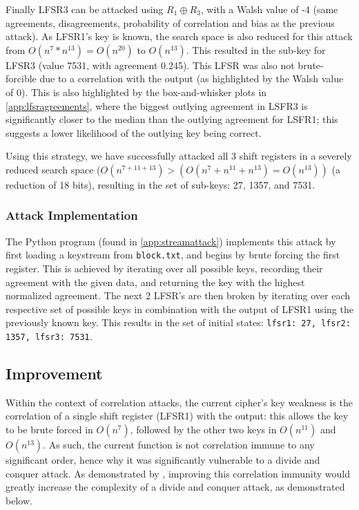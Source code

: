 \documentclass[british,10pt,a4paper]{article}
\begin{document}
Finally LFSR3 can be attacked using \(R_1 \oplus R_3\), with a Walsh value of -4 (same agreements, disagreements, probability of correlation and bias as the previous attack).
As LFSR1's key is known, the search space is also reduced for this attack from \(O(n^{7} * n^{13})=O(n^{20})\) to \(O(n^{13})\). This resulted in the sub-key for LFSR3 (value 7531, with agreement 0.245). This LFSR was also not brute-forcible due to a correlation with the output (as highlighted by the Walsh value of 0). This is also highlighted by the box-and-whisker plots in \autoref{app:lfsragreements}, where the biggest outlying agreement in LSFR3 is significantly closer to the median than the outlying agreement for LSFR1; this suggests a lower likelihood of the outlying key being correct.

Using this strategy, we have successfully attacked all 3 shift registers in a severely reduced search space (\(O(n^{7+11+13})>(O(n^{7}+n^{11}+n^{13})=O(n^{13}))\) (a reduction of 18 bits), resulting in the set of sub-keys: 27, 1357, and 7531.
\subsubsection{Attack Implementation}
The Python program (found in \autoref{app:streamattack}) implements this attack by first loading a keystream from \lstinline{block.txt}, and begins by brute forcing the first register.
This is achieved by iterating over all possible keys, recording their agreement with the given data, and returning the key with the highest normalized agreement.
The next 2 LFSR's are then broken by iterating over each respective set of possible keys in combination with the output of LFSR1 using the previously known key.
This results in the set of initial states: \lstinline{lfsr1: 27, lfsr2: 1357, lfsr3: 7531}.

\subsection{Improvement}
Within the context of correlation attacks, the current cipher's key weakness is the correlation of a single shift register (LFSR1) with the output: this allows the key to be brute forced in \(O(n^7)\), followed by the other two keys in \(O(n^{11})\) and \(O(n^{13})\).
As such, the current function is not correlation immune to any significant order, hence why it was significantly vulnerable to a divide and conquer attack. As demonstrated by \citet{siegenthaler}, improving this correlation immunity would greatly increase the complexity of a divide and conquer attack, as demonstrated below.
\end{document}

